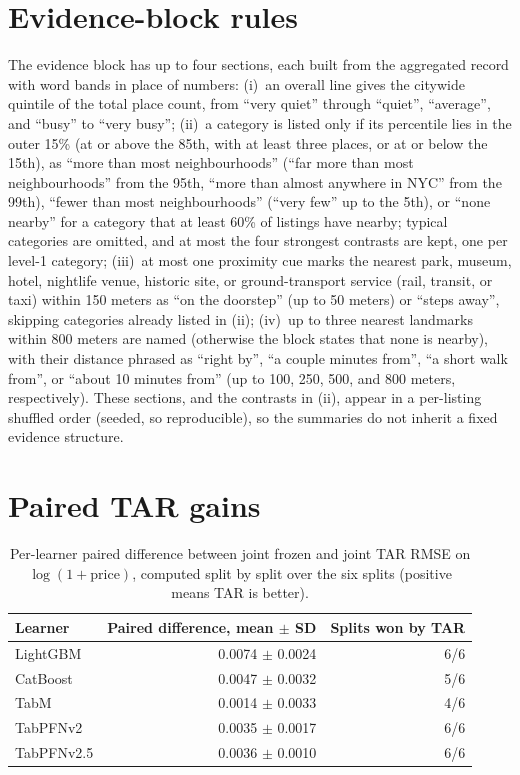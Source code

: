 \documentclass{article}
\begin{document}
\section{Evidence-block rules}
\label{app:evidence}

The evidence block has up to four sections, each built from the aggregated record with word bands in place of numbers:
(i)~an overall line gives the citywide quintile of the total place count, from ``very quiet'' through ``quiet'', ``average'', and ``busy'' to ``very busy'';
(ii)~a category is listed only if its percentile lies in the outer 15\% (at or above the 85th, with at least three places, or at or below the 15th),
as ``more than most neighbourhoods'' (``far more than most neighbourhoods'' from the 95th, ``more than almost anywhere in NYC'' from the 99th),
``fewer than most neighbourhoods'' (``very few'' up to the 5th), or ``none nearby'' for a category that at least 60\% of listings have nearby;
typical categories are omitted, and at most the four strongest contrasts are kept, one per level-1 category;
(iii)~at most one proximity cue marks the nearest park, museum, hotel, nightlife venue, historic site, or ground-transport service
(rail, transit, or taxi) within 150 meters as ``on the doorstep'' (up to 50 meters) or ``steps away'', skipping categories already listed in (ii);
(iv)~up to three nearest landmarks within 800 meters are named (otherwise the block states that none is nearby), with their distance phrased as ``right by'', ``a couple minutes from'', ``a short walk from'',
or ``about 10 minutes from'' (up to 100, 250, 500, and 800 meters, respectively).
These sections, and the contrasts in (ii), appear in a per-listing shuffled order (seeded, so reproducible),
so the summaries do not inherit a fixed evidence structure.

\section{Paired TAR gains}
\label{app:paired}

\begin{table}[h]
  \caption{Per-learner paired difference between joint frozen and joint TAR RMSE on $\log(1+\text{price})$,
    computed split by split over the six splits (positive means TAR is better).}
  \label{tab:paired}
  \centering
  \small
  \begin{tabular}{lrr}
    \toprule
    Learner & Paired difference, mean $\pm$ SD & Splits won by TAR \\
    \midrule
    LightGBM   & 0.0074 $\pm$ 0.0024 & 6/6 \\
    CatBoost   & 0.0047 $\pm$ 0.0032 & 5/6 \\
    TabM       & 0.0014 $\pm$ 0.0033 & 4/6 \\
    TabPFNv2   & 0.0035 $\pm$ 0.0017 & 6/6 \\
    TabPFNv2.5 & 0.0036 $\pm$ 0.0010 & 6/6 \\
    \bottomrule
  \end{tabular}
\end{table}
\end{document}

